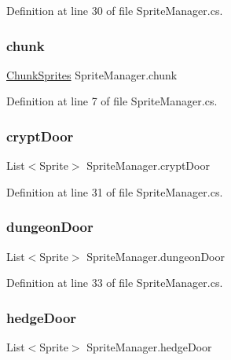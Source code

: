 Definition at line 30 of file Sprite\+Manager.\+cs.

\mbox{\label{class_sprite_manager_ae36fc0375ef03f1a92f4dc5ce5e8c28e}} 
\subsubsection{\texorpdfstring{chunk}{chunk}}
{\footnotesize\ttfamily \mbox{\hyperlink{class_chunk_sprites}{Chunk\+Sprites}} Sprite\+Manager.\+chunk}



Definition at line 7 of file Sprite\+Manager.\+cs.

\mbox{\label{class_sprite_manager_a534759a1cd37b734b35d39009c05433a}} 
\subsubsection{\texorpdfstring{cryptDoor}{cryptDoor}}
{\footnotesize\ttfamily List$<$Sprite$>$ Sprite\+Manager.\+crypt\+Door}



Definition at line 31 of file Sprite\+Manager.\+cs.

\mbox{\label{class_sprite_manager_aa8fb324d0bd5bafec97e314f07322f52}} 
\subsubsection{\texorpdfstring{dungeonDoor}{dungeonDoor}}
{\footnotesize\ttfamily List$<$Sprite$>$ Sprite\+Manager.\+dungeon\+Door}



Definition at line 33 of file Sprite\+Manager.\+cs.

\mbox{\label{class_sprite_manager_ae9ce272224734b0bbeee411220ee61a9}} 
\subsubsection{\texorpdfstring{hedgeDoor}{hedgeDoor}}
{\footnotesize\ttfamily List$<$Sprite$>$ Sprite\+Manager.\+hedge\+Door}



